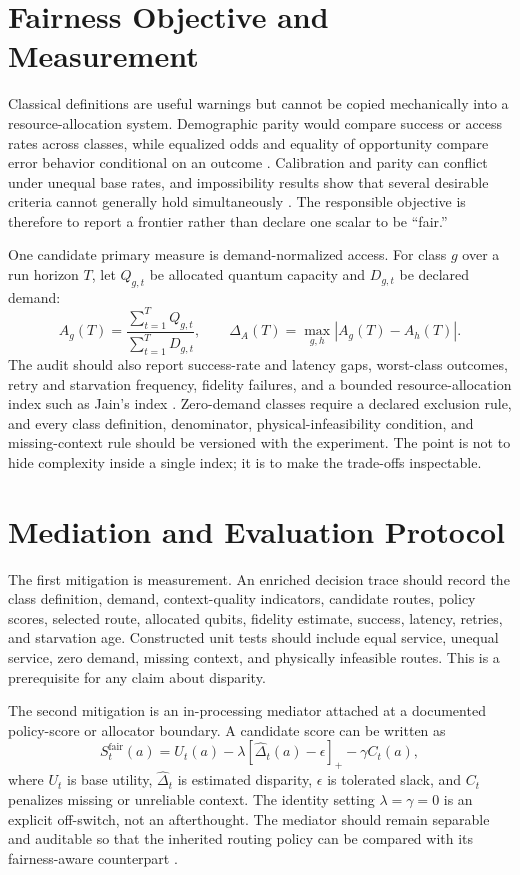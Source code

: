 \documentclass[10pt,conference]{IEEEtran}
\begin{document}
\section{Fairness Objective and Measurement}
Classical definitions are useful warnings but cannot be copied mechanically
into a resource-allocation system. Demographic parity would compare success or
access rates across classes, while equalized odds and equality of opportunity
compare error behavior conditional on an outcome \cite{hardt2016}. Calibration
and parity can conflict under unequal base rates, and impossibility results
show that several desirable criteria cannot generally hold simultaneously
\cite{chouldechova2017,kleinberg2017}. The responsible objective is therefore
to report a frontier rather than declare one scalar to be ``fair.''

One candidate primary measure is demand-normalized access. For class $g$ over
a run horizon $T$, let $Q_{g,t}$ be allocated quantum capacity and $D_{g,t}$
be declared demand:
\begin{equation}
 A_g(T)=\frac{\sum_{t=1}^{T}Q_{g,t}}
 {\sum_{t=1}^{T}D_{g,t}}, \qquad
 \Delta_A(T)=\max_{g,h}|A_g(T)-A_h(T)|.
\end{equation}
The audit should also report success-rate and latency gaps, worst-class
outcomes, retry and starvation frequency, fidelity failures, and a bounded
resource-allocation index such as Jain's index \cite{jain1984}. Zero-demand
classes require a declared exclusion rule, and every class definition,
denominator, physical-infeasibility condition, and missing-context rule should
be versioned with the experiment. The point is not to hide complexity inside a
single index; it is to make the trade-offs inspectable.

\section{Mediation and Evaluation Protocol}
The first mitigation is measurement. An enriched decision trace should record
the class definition, demand, context-quality indicators, candidate routes,
policy scores, selected route, allocated qubits, fidelity estimate, success,
latency, retries, and starvation age. Constructed unit tests should include
equal service, unequal service, zero demand, missing context, and physically
infeasible routes. This is a prerequisite for any claim about disparity.

The second mitigation is an in-processing mediator attached at a documented
policy-score or allocator boundary. A candidate score can be written as
\begin{equation}
 S_t^{\mathrm{fair}}(a)=U_t(a)-\lambda[\widehat{\Delta}_t(a)-\epsilon]_+
 -\gamma C_t(a),
\end{equation}
where $U_t$ is base utility, $\widehat{\Delta}_t$ is estimated disparity,
$\epsilon$ is tolerated slack, and $C_t$ penalizes missing or unreliable
context. The identity setting $\lambda=\gamma=0$ is an explicit off-switch,
not an afterthought. The mediator should remain separable and auditable so
that the inherited routing policy can be compared with its fairness-aware
counterpart \cite{chen2020}.
\end{document}
